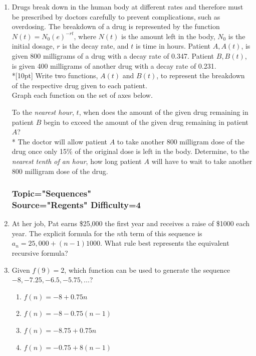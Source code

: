 \documentclass[12pt, oneside]{article}
\begin{document}
\begin{enumerate}
\newpage
\item Drugs break down in the human body at different rates and therefore must be prescribed by doctors carefully to prevent complications, such as overdosing. The breakdown of a drug is represented by the function $N(t)=N_0(e)^{-rt}$, where $N(t)$ is the amount left in the body, $N_0$ is the initial dosage, $r$ is the decay rate, and $t$ is time in hours. Patient $A, A(t)$, is given 800 milligrams of a drug with a decay rate of 0.347. Patient $B, B(t)$, is given 400 milligrams of another drug with a decay rate of 0.231.\\*[10pt]
Write two functions, $A(t)$ and $B(t)$, to represent the breakdown of the respective drug given to each patient.\\[1in]
Graph each function on the set of axes below.
\begin{center}
\end{center}

To the \emph{nearest hour}, $t$, when does the amount of the given drug remaining in patient $B$ begin to exceed the amount of the given drug remaining in patient $A$?\\*%
The doctor will allow patient $A$ to take another 800 milligram dose of the drug once only 15\% of the original dose is left in the body. Determine, to the \emph{nearest tenth of an hour}, how long patient $A$ will have to wait to take another 800 milligram dose of the drug. %
\newpage

\subsubsection*{Topic="Sequences"\\
Source="Regents" 
Difficulty=4}

\item At her job, Pat earns \$25,000 the first year and receives a raise of \$1000 each year. The explicit formula for the $n$th term of this sequence is $a_n = 25,000 + (n - 1)1000$. What rule best represents the equivalent recursive formula?

\item Given $f(9)=2$, which function can be used to generate the sequence  $-8, -7.25, -6.5, -5.75,...$?
\begin{enumerate}
    \item $f(n)=-8+0.75n$
    \item $f(n)=-8-0.75(n-1)$
    \item $f(n)=-8.75+0.75n$
    \item $f(n)=-0.75+8(n-1)$
\end{enumerate} %


\end{enumerate}
\end{document}
